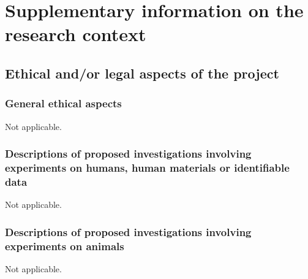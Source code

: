 \documentclass[a4paper,11pt,headings=normal]{scrartcl}
\begin{document}
\setcounter{page}{1}


\section{Supplementary information on the research context}
\subsection{Ethical and/or legal aspects of the project}
\subsubsection{General ethical aspects}
Not applicable.

\subsubsection{Descriptions of proposed investigations involving experiments on 
humans, human materials or identifiable data}
Not applicable.

\subsubsection{Descriptions of proposed investigations involving experiments on 
animals}
Not applicable.
\end{document}
